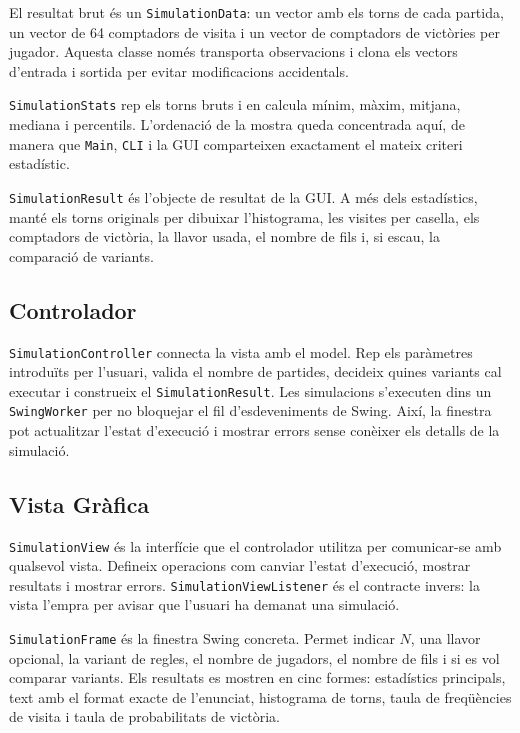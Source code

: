 \documentclass[conference,compsoc]{IEEEtran}
\begin{document}
El resultat brut és un \texttt{SimulationData}: un vector amb els torns de cada
partida, un vector de 64 comptadors de visita i un vector de comptadors de
victòries per jugador. Aquesta classe només transporta observacions i clona els
vectors d'entrada i sortida per evitar modificacions accidentals.

\texttt{SimulationStats} rep els torns bruts i en calcula mínim, màxim, mitjana,
mediana i percentils. L'ordenació de la mostra queda concentrada aquí, de manera que
\texttt{Main}, \texttt{CLI} i la GUI comparteixen exactament el mateix criteri
estadístic.

\texttt{SimulationResult} és l'objecte de resultat de la GUI. A més dels estadístics,
manté els torns originals per dibuixar l'histograma, les visites per casella, els
comptadors de victòria, la llavor usada, el nombre de fils i, si escau, la
comparació de variants.

\subsection{Controlador}

\texttt{SimulationController} connecta la vista amb el model. Rep els paràmetres
introduïts per l'usuari, valida el nombre de partides, decideix quines variants cal
executar i construeix el \texttt{SimulationResult}. Les simulacions s'executen dins
un \texttt{SwingWorker} per no bloquejar el fil d'esdeveniments de Swing. Així,
la finestra pot actualitzar l'estat d'execució i mostrar errors sense conèixer els
detalls de la simulació.

\subsection{Vista Gràfica}

\texttt{SimulationView} és la interfície que el controlador utilitza per comunicar-se
amb qualsevol vista. Defineix operacions com canviar l'estat d'execució, mostrar
resultats i mostrar errors. \texttt{SimulationViewListener} és el contracte invers:
la vista l'empra per avisar que l'usuari ha demanat una simulació.

\texttt{SimulationFrame} és la finestra Swing concreta. Permet indicar $N$, una
llavor opcional, la variant de regles, el nombre de jugadors, el nombre de fils i si
es vol comparar variants. Els resultats es mostren en cinc formes: estadístics
principals, text amb el format exacte de l'enunciat, histograma de torns, taula de
freqüències de visita i taula de probabilitats de victòria.
\end{document}
